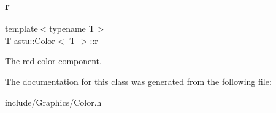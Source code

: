 \subsubsection{\texorpdfstring{r}{r}}
{\footnotesize\ttfamily template$<$typename T$>$ \\
T \hyperlink{classastu_1_1Color}{astu\+::\+Color}$<$ T $>$\+::r}

The red color component. 

The documentation for this class was generated from the following file\+:\begin{DoxyCompactItemize}
\item 
include/\+Graphics/Color.\+h\end{DoxyCompactItemize}
